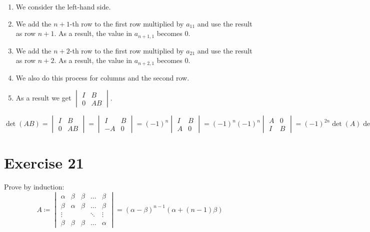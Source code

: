 \documentclass[a4paper]{article}
\theoremstyle{definition}
\begin{document}
\begin{enumerate}
  \item We consider the left-hand side.
  \item We add the $n+1$-th row to the first row multiplied by $a_{11}$ and use the result as row $n+1$.
    As a result, the value in $a_{n+1,1}$ becomes $0$.
  \item We add the $n+2$-th row to the first row multiplied by $a_{21}$ and use the result as row $n+2$.
    As a result, the value in $a_{n+2,1}$ becomes $0$.
  \item We also do this process for columns and the second row.
  \item As a result we get $\begin{vmatrix} I & B \\ 0 & AB \end{vmatrix}$.
\end{enumerate}

\[
  \det(AB)
  = \begin{vmatrix} I & B \\ 0 & AB \end{vmatrix}
  = \begin{vmatrix} I & B \\ -A & 0 \end{vmatrix}
  = (-1)^n \begin{vmatrix} I & B \\ A & 0 \end{vmatrix}
  = (-1)^n (-1)^n \begin{vmatrix} A & 0 \\ I & B \end{vmatrix}
  = (-1)^{2n} \det(A) \det(B)
\]


\section*{Exercise 21}
\begin{ex}
  Prove by induction:
  \[
    A \coloneqq
    \begin{vmatrix}
      \alpha & \beta & \beta & \ldots & \beta \\
      \beta & \alpha & \beta & \ldots & \beta \\
      \vdots &       &       & \ddots & \vdots \\
      \beta & \beta & \beta & \ldots & \alpha
    \end{vmatrix}
    = (\alpha - \beta)^{n-1} (\alpha + (n - 1) \beta)
  \]
\end{ex}
\end{document}
